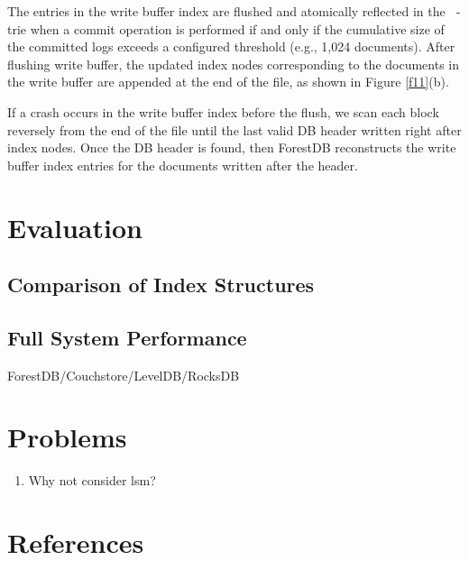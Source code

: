 \documentclass[11pt]{article}
\DeclareMathOperator{\HBP}{\text{HB}^+}
\begin{document}
The entries in the write buffer index are flushed and atomically reflected in the \(\HBP\)-trie when a
commit operation is performed if and only if the cumulative size of the committed logs exceeds a
configured threshold (e.g., 1,024 documents). After flushing write buffer, the updated index nodes
corresponding to the documents in the write buffer are appended at the end of the file, as shown in
Figure \ref{f11}(b).

If a crash occurs in the write buffer index before the flush, we scan each block reversely from the
end of the file until the last valid DB header written right after index nodes. Once the DB header is
found, then ForestDB reconstructs the write buffer index entries for the documents written after the
header.
\section{Evaluation}
\label{sec:org36a4fa1}
\subsection{Comparison of Index Structures}
\label{sec:org9d1052c}
\subsection{Full System Performance}
\label{sec:org4b7b607}
ForestDB/Couchstore/LevelDB/RocksDB
\section{Problems}
\label{sec:orgecc9ffd}
\begin{enumerate}
\item Why not consider lsm?
\end{enumerate}
\section{References}
\label{sec:orgca4f479}
\label{bibliographystyle link}



\end{document}
